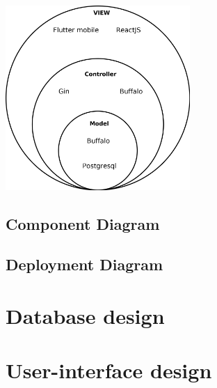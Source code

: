 		\begin{center}
		\includegraphics[width=7cm]{Diagram/MVC.png}
		\end{center}





	\subsection{Component Diagram}

	\subsection{Deployment Diagram}

\section{Database design}

\section{User-interface design}